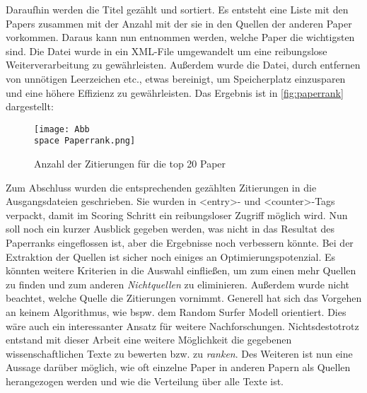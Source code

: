 Daraufhin werden die Titel gezählt und sortiert. Es entsteht eine Liste mit den Papers zusammen mit der Anzahl mit der sie in den Quellen der anderen Paper vorkommen. Daraus kann nun entnommen werden, welche Paper die wichtigsten sind. Die Datei wurde in ein XML-File umgewandelt um eine reibungslose Weiterverarbeitung zu gewährleisten. Außerdem wurde die Datei, durch entfernen von unnötigen Leerzeichen etc., etwas bereinigt, um Speicherplatz einzusparen und eine höhere Effizienz zu gewährleisten. Das Ergebnis ist in \autoref{fig:paperrank} dargestellt:




\begin{figure}[ht]

    \texttt{[image: Abb\\space Paperrank.png]}
  \caption[]{Anzahl der Zitierungen für die top 20 Paper}
\label{fig:paperrank}
\end{figure}



Zum Abschluss wurden die entsprechenden gezählten Zitierungen in die Ausgangsdateien geschrieben. Sie wurden in <entry>- und <counter>-Tags verpackt, damit im Scoring Schritt ein reibungsloser Zugriff möglich wird.
Nun soll noch ein kurzer Ausblick gegeben werden, was nicht in das Resultat des Paperranks eingeflossen ist, aber die Ergebnisse noch verbessern könnte. Bei der Extraktion der Quellen ist sicher noch einiges an Optimierungspotenzial. Es könnten weitere Kriterien in die Auswahl einfließen, um zum einen mehr Quellen zu finden und zum anderen \emph{Nichtquellen} zu eliminieren. Außerdem wurde nicht beachtet, welche Quelle die Zitierungen vornimmt. Generell hat sich das Vorgehen an keinem Algorithmus, wie bspw. dem Random Surfer Modell orientiert. Dies wäre auch ein interessanter Ansatz für weitere Nachforschungen. 
Nichtsdestotrotz entstand mit dieser Arbeit eine weitere Möglichkeit die gegebenen wissenschaftlichen Texte zu bewerten bzw. zu \emph{ranken}. Des Weiteren ist nun eine Aussage darüber möglich, wie oft einzelne Paper in anderen Papern als Quellen herangezogen werden und wie die  Verteilung über alle Texte ist.



